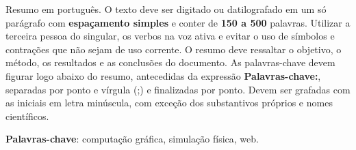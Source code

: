 \begin{resumo}
\begin{SingleSpace}
Resumo em português. O texto deve ser digitado ou datilografado em um só parágrafo com \textbf{espaçamento simples} e conter de \textbf{150 a 500} palavras. Utilizar a terceira pessoa do singular, os verbos na voz ativa e evitar o uso de símbolos e contrações que não sejam de uso corrente. O resumo deve ressaltar o  objetivo, o método, os resultados e as conclusões do documento. As palavras-chave devem figurar logo abaixo do resumo, antecedidas da expressão \textbf{Palavras-chave:}, separadas por ponto e vírgula (;) e finalizadas por ponto. Devem ser grafadas com as iniciais em letra minúscula, com exceção dos substantivos próprios e nomes científicos.
\end{SingleSpace}
\vspace{\onelineskip}
\textbf{Palavras-chave}: computação gráfica, simulação física, web.

\end{resumo}



